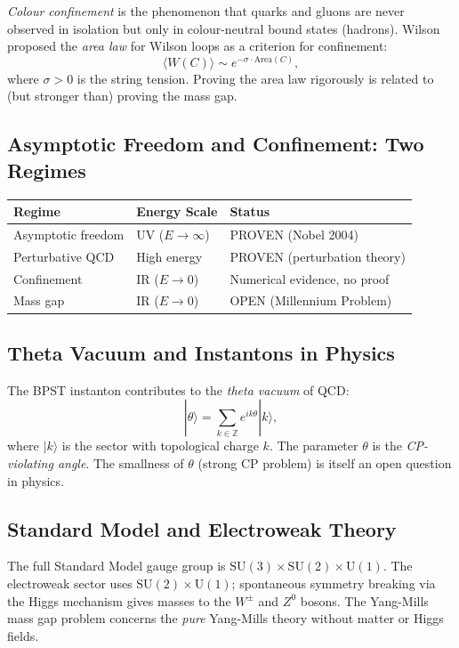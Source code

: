 \documentclass[12pt,a4paper]{amsart}
\theoremstyle{definition}
\theoremstyle{remark}
\begin{document}
\emph{Colour confinement} is the phenomenon that quarks and gluons are never observed
in isolation but only in colour-neutral bound states (hadrons). Wilson \cite{Wilson1974}
proposed the \emph{area law} for Wilson loops as a criterion for confinement:
\[
  \langle W(C) \rangle \sim e^{-\sigma \cdot \mathrm{Area}(C)},
\]
where $\sigma > 0$ is the string tension. Proving the area law rigorously is related
to (but stronger than) proving the mass gap.

\subsection{Asymptotic Freedom and Confinement: Two Regimes}

\begin{center}
\begin{tabular}{lll}
\toprule
\textbf{Regime} & \textbf{Energy Scale} & \textbf{Status} \\
\midrule
Asymptotic freedom & UV ($E \to \infty$) & PROVEN (Nobel 2004) \\
Perturbative QCD & High energy & PROVEN (perturbation theory) \\
Confinement & IR ($E \to 0$) & Numerical evidence, no proof \\
Mass gap & IR ($E \to 0$) & OPEN (Millennium Problem) \\
\bottomrule
\end{tabular}
\end{center}

\subsection{Theta Vacuum and Instantons in Physics}

The BPST instanton contributes to the \emph{theta vacuum} of QCD:
\[
  |\theta\rangle = \sum_{k \in \mathbb{Z}} e^{i k \theta} |k\rangle,
\]
where $|k\rangle$ is the sector with topological charge $k$. The parameter $\theta$
is the \emph{CP-violating angle}. The smallness of $\theta$ (strong CP problem) is
itself an open question in physics.

\subsection{Standard Model and Electroweak Theory}

The full Standard Model gauge group is
$\mathrm{SU}(3) \times \mathrm{SU}(2) \times \mathrm{U}(1)$.
The electroweak sector uses $\mathrm{SU}(2) \times \mathrm{U}(1)$; spontaneous symmetry
breaking via the Higgs mechanism gives masses to the $W^\pm$ and $Z^0$ bosons. The
Yang-Mills mass gap problem concerns the \emph{pure} Yang-Mills theory without matter
or Higgs fields.
\end{document}
